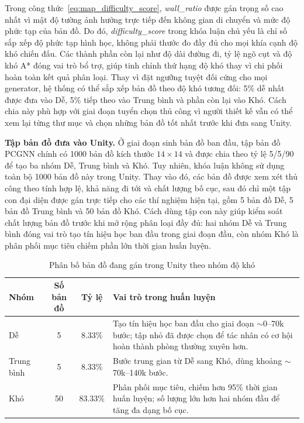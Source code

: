 Trong công thức~\ref{eq:map_difficulty_score}, \emph{wall\_ratio} được gán trọng số cao nhất vì mật độ tường ảnh hưởng trực tiếp đến không gian di chuyển và mức độ phức tạp của bản đồ. Do đó, \emph{difficulty\_score} trong khóa luận chủ yếu là chỉ số sắp xếp độ phức tạp hình học, không phải thước đo đầy đủ cho mọi khía cạnh độ khó chiến đấu. Các thành phần còn lại như độ dài đường đi, tỷ lệ ngõ cụt và độ khó A* đóng vai trò bổ trợ, giúp tinh chỉnh thứ hạng độ khó thay vì chi phối hoàn toàn kết quả phân loại. Thay vì đặt ngưỡng tuyệt đối cứng cho mọi generator, hệ thống có thể sắp xếp bản đồ theo độ khó tương đối: 5\% dễ nhất được đưa vào Dễ, 5\% tiếp theo vào Trung bình và phần còn lại vào Khó. Cách chia này phù hợp với giai đoạn tuyển chọn thủ công vì người thiết kế vẫn có thể xem lại từng thư mục và chọn những bản đồ tốt nhất trước khi đưa sang Unity.

\textbf{Tập bản đồ đưa vào Unity.} Ở giai đoạn sinh bản đồ ban đầu, tập bản đồ PCGNN chính có 1000 bản đồ kích thước $14\times14$ và được chia theo tỷ lệ 5/5/90 để tạo ba nhóm Dễ, Trung bình và Khó. Tuy nhiên, khóa luận không sử dụng toàn bộ 1000 bản đồ này trong Unity. Thay vào đó, các bản đồ được xem xét thủ công theo tính hợp lệ, khả năng đi tới và chất lượng bố cục, sau đó chỉ một tập con đại diện được gán trực tiếp cho các thí nghiệm hiện tại, gồm 5 bản đồ Dễ, 5 bản đồ Trung bình và 50 bản đồ Khó. Cách dùng tập con này giúp kiểm soát chất lượng bản đồ trước khi mở rộng phân loại đầy đủ: hai nhóm Dễ và Trung bình đóng vai trò tạo tín hiệu học ban đầu trong giai đoạn đầu, còn nhóm Khó là phân phối mục tiêu chiếm phần lớn thời gian huấn luyện.

\begin{table}[H]
    \centering
    \small
    \caption{Phân bố bản đồ đang gán trong Unity theo nhóm độ khó}
    \label{tab:map_split}
    \begin{tabular}{|p{2.5cm}|c|c|p{7.5cm}|}
        \hline
        \textbf{Nhóm} & \textbf{Số bản đồ} & \textbf{Tỷ lệ} & \textbf{Vai trò trong huấn luyện} \\
        \hline
        Dễ   & 5  & 8.33\%  & Tạo tín hiệu học ban đầu cho giai đoạn $\sim$0--70k bước; tập nhỏ đã được chọn để tác nhân có cơ hội hoàn thành phòng thường xuyên hơn. \\
        \hline
        Trung bình & 5  & 8.33\%  & Bước trung gian từ Dễ sang Khó, dùng khoảng $\sim$70k--140k bước. \\
        \hline
        Khó   & 50 & 83.33\% & Phân phối mục tiêu, chiếm hơn 95\% thời gian huấn luyện; số lượng lớn hơn hai nhóm đầu để tăng đa dạng bố cục. \\
        \hline
    \end{tabular}
\end{table}

